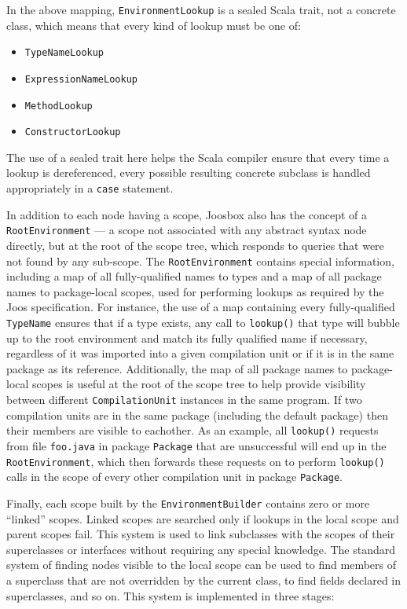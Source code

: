 \documentclass[letterpaper]{article}
\begin{document}
  In the above mapping, {\tt EnvironmentLookup} is a sealed Scala trait, not a concrete
  class, which means that every kind of lookup must be one of:

  \begin{itemize}
    \item {\tt TypeNameLookup}
    \item {\tt ExpressionNameLookup}
    \item {\tt MethodLookup}
    \item {\tt ConstructorLookup}
  \end{itemize}

  The use of a sealed trait here helps the Scala compiler ensure that every
time a lookup is   dereferenced, every possible resulting concrete subclass is
handled appropriately in a {\tt case} statement.

  
  In addition to each node having a scope, Joosbox also has the concept of a
  {\tt RootEnvironment} --- a scope not associated with any abstract syntax
  node directly, but at the root of the scope tree, which responds to queries
  that were not found by any sub-scope. The {\tt RootEnvironment} contains
  special information, including a map of all fully-qualified names to types
  and a map of all package names to package-local scopes, used for performing
  lookups as required by the Joos specification. For instance, the use of a
  map containing every fully-qualified {\tt TypeName} ensures that if a type
  exists, any call to {\tt lookup()} that type will bubble up to the root
  environment and match its fully qualified name if necessary, regardless of
  it was imported into a given compilation unit or if it is in the same
  package as its reference. Additionally, the map of all package names to
  package-local scopes is useful at the root of the scope tree to help provide
  visibility  between different {\tt CompilationUnit} instances in the same
  program. If two compilation units are in the same package (including the
  default package) then their members are visible to eachother. As an example,
  all {\tt lookup()} requests from file {\tt foo.java} in package {\tt Package}
  that are unsuccessful will end up in the {\tt RootEnvironment}, which then
  forwards these requests on to perform {\tt lookup()} calls in the scope of
  every other compilation unit in package {\tt Package}.


  Finally, each scope built by the {\tt EnvironmentBuilder} contains zero or
  more ``linked'' scopes. Linked scopes are searched only if lookups in the
  local scope and parent scopes fail. This system is used to link subclasses
  with the scopes of their superclasses or interfaces without requiring any
  special knowledge. The standard system of finding nodes visible to the local
  scope can be used to find members of a superclass that are not overridden
  by the current class, to find fields declared in superclasses,
  and so on. This system is implemented in three stages:
\end{document}
